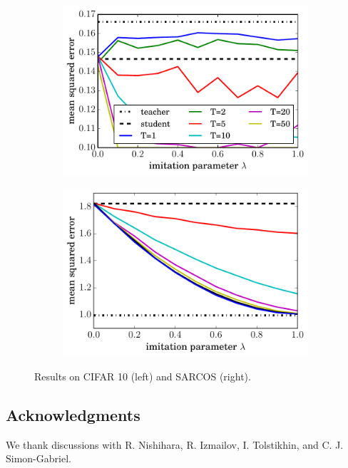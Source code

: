 \documentclass{article}
\begin{document}
\begin{figure}
  \begin{subfigure}{0.5\textwidth}
    \begin{center}
    \includegraphics[width=.85\textwidth]{figures/distillation_cifar10_semi.pdf}
    \end{center}
  \end{subfigure}
  \begin{subfigure}{0.5\textwidth}
    \begin{center}
    \includegraphics[width=.85\textwidth]{figures/distillation_sarcos_300.pdf}
    \end{center}
  \end{subfigure}
  \caption{Results on CIFAR 10 (left) and SARCOS (right).}
  \label{fig:others}
\end{figure}

\clearpage
\newpage
\subsection*{Acknowledgments}
We thank discussions with R. 
Nishihara, R. Izmailov, I. Tolstikhin, and C. J. Simon-Gabriel.



\end{document}
